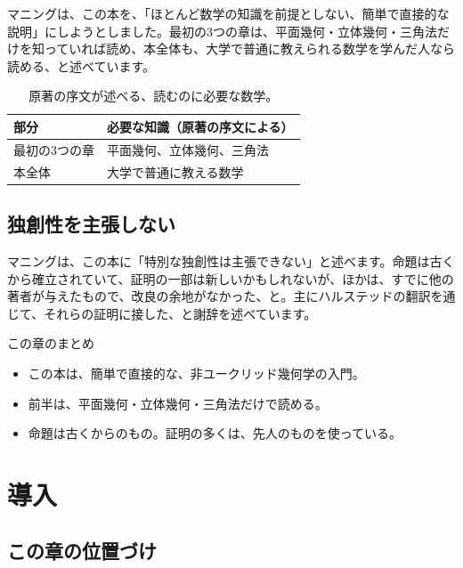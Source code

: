 \documentclass[a4paper,11pt,openany]{ltjsbook}
\begin{document}
マニングは、この本を、「ほとんど数学の知識を前提としない、簡単で直接的な説明」にしようとしました。最初の3つの章は、平面幾何・立体幾何・三角法だけを知っていれば読め、本全体も、大学で普通に教えられる数学を学んだ人なら読める、と述べています。

\begin{table}[htbp]
\centering
\begin{tabular}{ll}
\toprule
部分 & 必要な知識（原著の序文による）\\
\midrule
最初の3つの章 & 平面幾何、立体幾何、三角法\\
本全体 & 大学で普通に教える数学\\
\bottomrule
\end{tabular}
\caption{原著の序文が述べる、読むのに必要な数学。}
\end{table}

\section{独創性を主張しない}

マニングは、この本に「特別な独創性は主張できない」と述べます。命題は古くから確立されていて、証明の一部は新しいかもしれないが、ほかは、すでに他の著者が与えたもので、改良の余地がなかった、と。主にハルステッドの翻訳を通じて、それらの証明に接した、と謝辞を述べています。

\begin{pointbox}{この章のまとめ}
\begin{itemize}[leftmargin=*]
\item この本は、簡単で直接的な、非ユークリッド幾何学の入門。
\item 前半は、平面幾何・立体幾何・三角法だけで読める。
\item 命題は古くからのもの。証明の多くは、先人のものを使っている。
\end{itemize}
\end{pointbox}

\chapter{導入}

\section{この章の位置づけ}
\end{document}
